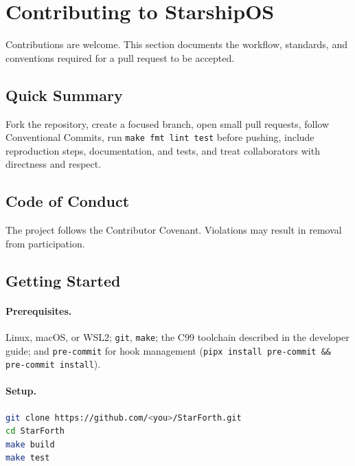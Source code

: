 
\section{Contributing to StarshipOS}

Contributions are welcome. This section documents the workflow, standards, and
conventions required for a pull request to be accepted.

\subsection{Quick Summary}

Fork the repository, create a focused branch, open small pull requests, follow
Conventional Commits, run \texttt{make fmt lint test} before pushing, include
reproduction steps, documentation, and tests, and treat collaborators with directness
and respect.

\subsection{Code of Conduct}

The project follows the Contributor Covenant. Violations may result in removal from
participation. %

\subsection{Getting Started}

\paragraph{Prerequisites.}
Linux, macOS, or WSL2; \texttt{git}, \texttt{make}; the C99 toolchain described in the
developer guide; and \texttt{pre-commit} for hook management
(\texttt{pipx install pre-commit \&\& pre-commit install}).

\paragraph{Setup.}
\begin{lstlisting}[language=bash]
git clone https://github.com/<you>/StarForth.git
cd StarForth
make build
make test
\end{lstlisting}

